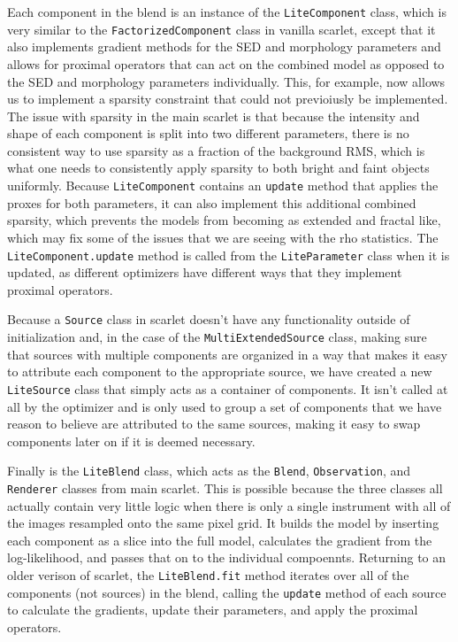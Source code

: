 \documentclass[DM,authoryear,toc]{lsstdoc}
\begin{document}
Each component in the blend is an instance of the \texttt{LiteComponent} class, which is very similar to the \texttt{FactorizedComponent} class in vanilla scarlet, except that it also implements gradient methods for the SED and morphology parameters and allows for proximal operators that can act on the combined model as opposed to the SED and morphology parameters individually. This, for example, now allows us to implement a sparsity constraint that could not previoiusly be implemented. The issue with sparsity in the main scarlet is that because the intensity and shape of each component is split into two different parameters, there is no consistent way to use sparsity as a fraction of the background RMS, which is what one needs to consistently apply sparsity to both bright and faint objects uniformly. Because \texttt{LiteComponent} contains an \texttt{update} method that applies the proxes for both parameters, it can also implement this additional combined sparsity, which prevents the models from becoming as extended and fractal like, which may fix some of the issues that we are seeing with the rho statistics. The \texttt{LiteComponent.update} method is called from the \texttt{LiteParameter} class when it is updated, as different optimizers have different ways that they implement proximal operators.

Because a \texttt{Source} class in scarlet doesn't have any functionality outside of initialization and, in the case of the \texttt{MultiExtendedSource} class, making sure that sources with multiple components are organized in a way that makes it easy to attribute each component to the appropriate source, we have created a new \texttt{LiteSource} class that simply acts as a container of components. It isn't called at all by the optimizer and is only used to group a set of components that we have reason to believe are attributed to the same sources, making it easy to swap components later on if it is deemed necessary.

Finally is the \texttt{LiteBlend} class, which acts as the \texttt{Blend}, \texttt{Observation}, and \texttt{Renderer} classes from main scarlet. This is possible because the three classes all actually contain very little logic when there is only a single instrument with all of the images resampled onto the same pixel grid. It builds the model by inserting each component as a slice into the full model, calculates the gradient from the log-likelihood, and passes that on to the individual compoennts. Returning to an older verison of scarlet, the \texttt{LiteBlend.fit} method iterates over all of the components (not sources) in the blend, calling the \texttt{update} method of each source to calculate the gradients, update their parameters, and apply the proximal operators.
\end{document}
